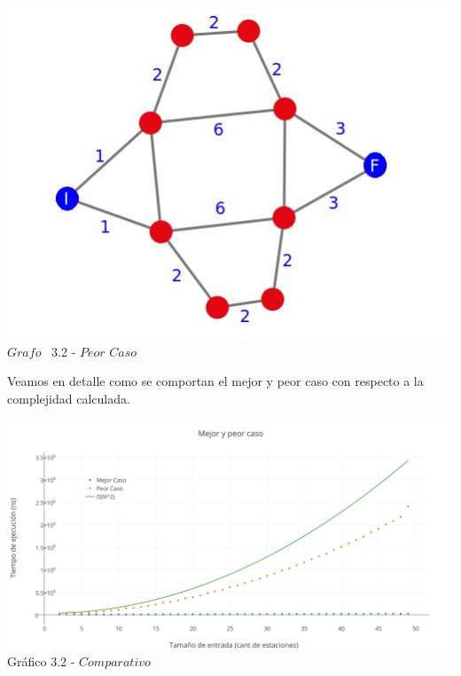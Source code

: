 \vspace*{0.3cm} \vspace*{0.3cm}
  \begin{center}
 \includegraphics[scale=0.5]{./EJ3/grafoMultiCamino.jpeg}
 \\{$Grafo$ \ 3.2 - $Peor$ $Caso$}
  \end{center}
  \vspace*{0.3cm}

Veamos en detalle como se comportan el mejor y peor caso con respecto a la complejidad calculada.\\

  
  \vspace*{0.3cm} \vspace*{0.3cm}
  \begin{center}
\includegraphics[scale=0.5]{./EJ3/mejorYpeorCaso.png}
{Gr\'afico 3.2 - $Comparativo$}
  \end{center}
  \vspace*{0.3cm}


